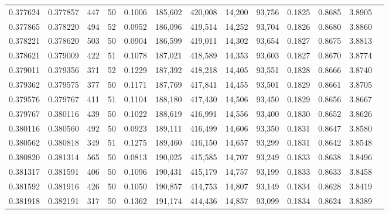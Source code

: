 \begin{tabular}{rrrrrrrrrrrrr}
0.377624 & 0.377857 &   447 &  50 &                                     0.1006 & 185,602 & 420,008 &  14,200 &  93,756 & 0.1825 & 0.8685 & 3.8905 \\
0.377865 & 0.378220 &   494 &  52 &                                     0.0952 & 186,096 & 419,514 &  14,252 &  93,704 & 0.1826 & 0.8680 & 3.8860 \\
0.378221 & 0.378620 &   503 &  50 &                                     0.0904 & 186,599 & 419,011 &  14,302 &  93,654 & 0.1827 & 0.8675 & 3.8813 \\
0.378621 & 0.379009 &   422 &  51 &                                     0.1078 & 187,021 & 418,589 &  14,353 &  93,603 & 0.1827 & 0.8670 & 3.8774 \\
0.379011 & 0.379356 &   371 &  52 &                                     0.1229 & 187,392 & 418,218 &  14,405 &  93,551 & 0.1828 & 0.8666 & 3.8740 \\
0.379362 & 0.379575 &   377 &  50 &                                     0.1171 & 187,769 & 417,841 &  14,455 &  93,501 & 0.1829 & 0.8661 & 3.8705 \\
0.379576 & 0.379767 &   411 &  51 &                                     0.1104 & 188,180 & 417,430 &  14,506 &  93,450 & 0.1829 & 0.8656 & 3.8667 \\
0.379767 & 0.380116 &   439 &  50 &                                     0.1022 & 188,619 & 416,991 &  14,556 &  93,400 & 0.1830 & 0.8652 & 3.8626 \\
0.380116 & 0.380560 &   492 &  50 &                                     0.0923 & 189,111 & 416,499 &  14,606 &  93,350 & 0.1831 & 0.8647 & 3.8580 \\
0.380562 & 0.380818 &   349 &  51 &                                     0.1275 & 189,460 & 416,150 &  14,657 &  93,299 & 0.1831 & 0.8642 & 3.8548 \\
0.380820 & 0.381314 &   565 &  50 &                                     0.0813 & 190,025 & 415,585 &  14,707 &  93,249 & 0.1833 & 0.8638 & 3.8496 \\
0.381317 & 0.381591 &   406 &  50 &                                     0.1096 & 190,431 & 415,179 &  14,757 &  93,199 & 0.1833 & 0.8633 & 3.8458 \\
0.381592 & 0.381916 &   426 &  50 &                                     0.1050 & 190,857 & 414,753 &  14,807 &  93,149 & 0.1834 & 0.8628 & 3.8419 \\
0.381918 & 0.382191 &   317 &  50 &                                     0.1362 & 191,174 & 414,436 &  14,857 &  93,099 & 0.1834 & 0.8624 & 3.8389 \\

\end{tabular}
